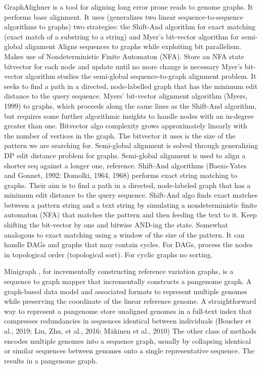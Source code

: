 \documentclass[11pt]{article}
\begin{document}
GraphAlighner \cite{rautiainenBitparallelSequencetographAlignment2019} is a tool 
for aligning long error prone reads to genome graphs. It performs base alignment.
It uses (generalizes two linear sequence-to-sequence algorithms to graphs) two 
strategies: the Shift-And algorithm for exact matching (exact match of a
substring to a string) and Myer’s bit-vector algorithm for semi-global alignment
Aligns sequences to graphs while exploiting bit parallelism. Makes use of
Nondeterministic Finite Automaton (NFA). Store an NFA state bitvector for
each node and update until no more change is necessary
Myer’s bit-vector algorithm studies the semi-global sequence-to-graph alignment 
problem. It seeks to find a path in a directed, node-labelled graph that has the
minimum edit distance to the query sequence. Myers’ bit-vector alignment 
algorithm (Myers, 1999) to graphs, which proceeds along the same lines as the
Shift-And algorithm, but requires some further algorithmic insights to handle 
nodes with an in-degree greater than one. Bitvector algo complexity grows 
approximately linearly with the number of vertices in the graph. The bitvector 
it uses is the size of the pattern we are searching for. Semi-global alignment 
is solved through generalizing DP edit distance problem for graphs. Semi-global 
alignment is used to align a shorter seq against a longer one, reference.
Shift-And algorithms (Baeza-Yates and Gonnet, 1992; Domolki, 1964, 1968) 
performs exact string matching to graphs. 
Their aim is to find a path in a directed, node-labeled graph that has a minimum
edit distance \cite{levenshteinBinaryCodesCapable1966a} to the query sequence. 
Shift-And algo finds exact matches between a pattern string and a text string by
simulating a nondeterministic finite automaton (NFA) that matches the pattern 
and then feeding the text to it.
Keep shifting the bit-vector by one and bitwise AND-ing the state. 
Somewhat analogous to exact matching using a window of the size of the pattern.
It can handle DAGs and  graphs that may contain cycles. For DAGs, process the 
nodes in topological order (topological sort). For cyclic graphs no sorting.

Minigraph \cite{liDesignConstructionReference2020}, for incrementally constructing 
reference variation graphs,
is a sequence to graph mapper that incrementally constructs a pangenome graph.
A graph-based data model and associated formats to represent multiple genomes 
while preserving the coordinate of the linear reference genome. 
A straightforward way to represent a pangenome store unaligned genomes in a
full-text index that compresses redundancies in sequences identical between 
individuals (Boucher et al., 2019; Liu, Zhu, et al., 2016; Mäkinen et al., 2010) 		
The other class of methods encodes multiple genomes into a sequence graph, 
usually by collapsing identical or similar sequences between genomes onto a 
single representative sequence. The results in a pangenome graph.
\end{document}
